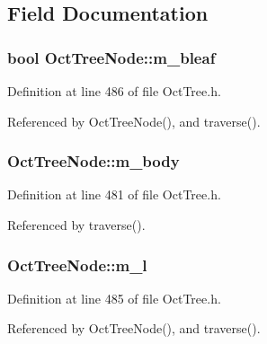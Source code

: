 \subsection{Field Documentation}
\subsubsection[{m\_\-bleaf}]{\setlength{\rightskip}{0pt plus 5cm}bool {\bf OctTreeNode::m\_\-bleaf}}\label{classOctTreeNode_a372678b0c96bb5a49b9b5eb7838a0ca3}


Definition at line 486 of file OctTree.h.



Referenced by OctTreeNode(), and traverse().

\subsubsection[{m\_\-body}]{ {\bf OctTreeNode::m\_\-body}}\label{classOctTreeNode_a0ab5b2f366573315d029dcdc5016cf97}


Definition at line 481 of file OctTree.h.



Referenced by traverse().

\subsubsection[{m\_\-l}]{ {\bf OctTreeNode::m\_\-l}}\label{classOctTreeNode_a361560ebacba06e8c838277643b1a713}


Definition at line 485 of file OctTree.h.



Referenced by OctTreeNode(), and traverse().


